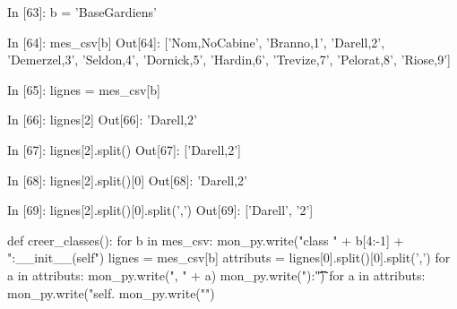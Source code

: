 \documentclass[french]{beamer}
\begin{document}
\begin{frame}[fragile]
\begin{pythoncode}
In [63]: b = 'BaseGardiens'

In [64]: mes_csv[b]
Out[64]: 
['Nom,NoCabine\n',
 'Branno,1\n',
 'Darell,2\n',
 'Demerzel,3\n',
 'Seldon,4\n',
 'Dornick,5\n',
 'Hardin,6\n',
 'Trevize,7\n',
 'Pelorat,8\n',
 'Riose,9\n']
\end{pythoncode}


\end{frame}



\begin{frame}[fragile]
\begin{pythoncode}
In [65]: lignes = mes_csv[b]

In [66]: lignes[2]
Out[66]: 'Darell,2\n'
\end{pythoncode}
  \pause

  \begin{pythoncode}
In [67]: lignes[2].split()
Out[67]: ['Darell,2']
\end{pythoncode}

  \pause

  \begin{pythoncode}
In [68]: lignes[2].split()[0]
Out[68]: 'Darell,2'
\end{pythoncode}

  \pause

  \begin{pythoncode}
In [69]: lignes[2].split()[0].split(',')
Out[69]: ['Darell', '2']
\end{pythoncode}



\end{frame}






\begin{frame}[fragile]
\begin{pythoncode}
def creer_classes():
    for b in mes_csv:
        mon_py.write("class " + b[4:-1] + ":\n\tdef __init__(self")
        lignes = mes_csv[b]
        attributs = lignes[0].split()[0].split(',')
        for a in attributs:
            mon_py.write(", " + a)
        mon_py.write("):\n\t\t")
        for a in attributs:
            mon_py.write("self.%
        mon_py.write("\n\n")
\end{pythoncode}


\end{frame}
\end{document}
